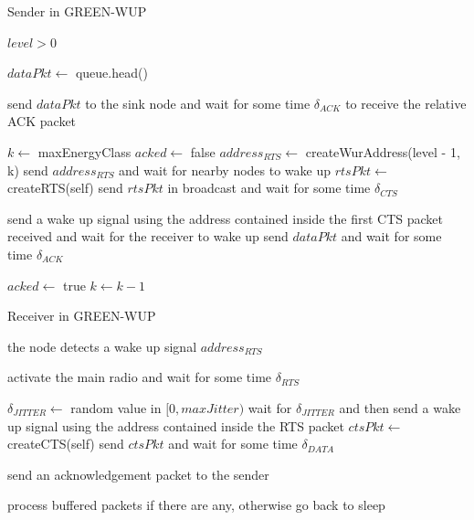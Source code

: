 \documentclass[binding=0.6cm,TFA]{sapthesis}
\begin{document}
\begin{algorithm}
    \caption{Sender in GREEN-WUP}
    \begin{algorithmic}
        \REQUIRE $level > 0$

            \STATE $dataPkt \leftarrow$ queue.head()

                \STATE send $dataPkt$ to the sink node and wait for some time $\delta_{ACK}$ to receive the relative ACK packet

            \ELSE
                \STATE $k \leftarrow$ maxEnergyClass
                \STATE $acked \leftarrow$ false
                    \STATE $address_{RTS} \leftarrow$ createWurAddress(level - 1, k)
                    \STATE send $address_{RTS}$ and wait for nearby nodes to wake up
                    \STATE $rtsPkt \leftarrow$ createRTS(self)
                    \STATE send $rtsPkt$ in broadcast and wait for some time $\delta_{CTS}$
                    
                        \STATE send a wake up signal using the address contained inside the first CTS packet received and wait for the receiver to wake up
                        \STATE send $dataPkt$ and wait for some time $\delta_{ACK}$

                            \STATE $acked \leftarrow$ true
                        \ENDIF
                    \ENDIF
                    \STATE $k \leftarrow k-1$
                \ENDWHILE
            \ENDIF
        
        \ENDWHILE
    \end{algorithmic}
\end{algorithm}

\begin{algorithm}
    \caption{Receiver in GREEN-WUP}
    \begin{algorithmic}
        \REQUIRE the node detects a wake up signal $address_{RTS}$

            \STATE activate the main radio and wait for some time $\delta_{RTS}$

                \STATE $\delta_{JITTER} \leftarrow$ random value in $[0,maxJitter)$
                \STATE wait for $\delta_{JITTER}$ and then send a wake up signal using the address contained inside the RTS packet
                \STATE $ctsPkt \leftarrow$ createCTS(self)
                \STATE send $ctsPkt$ and wait for some time $\delta_{DATA}$

                    \STATE send an acknowledgement packet to the sender
                \ENDIF
            \ENDIF

            \STATE process buffered packets if there are any, otherwise go back to sleep
        
    \end{algorithmic}
\end{algorithm}
\end{document}
